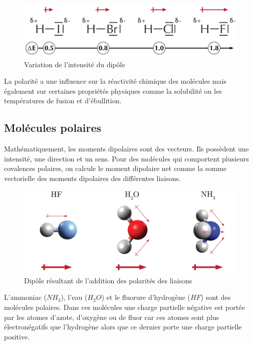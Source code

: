 \documentclass[
  11pt,
  a4paper,
  openany]{book}
\begin{document}
\begin{figure}

{\centering \includegraphics[width=0.6\linewidth]{images/dipole-0} 

}

\caption{Variation de l'intensité du dipôle}\label{fig:dipole-0}
\end{figure}

La polarité a une influence sur la réactivité chimique des molécules mais également sur certaines propriétés physiques comme la solubilité ou les températures de fusion et d'ébullition.

\hypertarget{moluxe9cules-polaires}{%
\subsection{Molécules polaires}\label{moluxe9cules-polaires}}

Mathématiquement, les moments dipolaires sont des vecteurs. Ils possèdent une intensité, une direction et un sens. Pour des molécules qui comportent plusieurs covalences polaires, on calcule le moment dipolaire net comme la somme vectorielle des moments dipolaires des différentes liaisons.

\begin{figure}

{\centering \includegraphics[width=0.6\linewidth]{images/dipole-1} 

}

\caption{Dipôle résultant de l'addition des polarités des liaisons}\label{fig:dipole-1}
\end{figure}

L'ammoniac (\(NH_3\)), l'eau (\(H_2O\)) et le fluorure d'hydrogène (\(HF\)) sont des molécules polaires. Dans ces molécules une charge partielle négative est portée par les atomes d'azote, d'oxygène ou de fluor car ces atomes sont plus électronégatifs que l'hydrogène alors que ce dernier porte une charge partielle positive.
\end{document}
